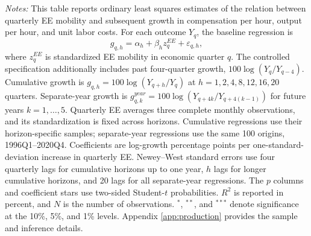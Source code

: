 \begin{table}[H]
\begin{minipage}[t]{\linewidth}
\textit{Notes:} This table reports ordinary least squares estimates of the relation between quarterly EE mobility and subsequent growth in compensation per hour, output per hour, and unit labor costs. For each outcome $Y_q$, the baseline regression is
\[g_{q,h}=\alpha_h+\beta_h z_q^{EE}+\varepsilon_{q,h},\]
where $z_q^{EE}$ is standardized EE mobility in economic quarter $q$. The controlled specification additionally includes past four-quarter growth, $100\log(Y_q/Y_{q-4})$. Cumulative growth is $g_{q,h}=100\log(Y_{q+h}/Y_q)$ at $h=1,2,4,8,12,16,20$ quarters. Separate-year growth is $g^{year}_{q,k}=100\log(Y_{q+4k}/Y_{q+4(k-1)})$ for future years $k=1,\ldots,5$. Quarterly EE averages three complete monthly observations, and its standardization is fixed across horizons. Cumulative regressions use their horizon-specific samples; separate-year regressions use the same 100 origins, 1996Q1--2020Q4. Coefficients are log-growth percentage points per one-standard-deviation increase in quarterly EE. Newey--West standard errors use four quarterly lags for cumulative horizons up to one year, $h$ lags for longer cumulative horizons, and 20 lags for all separate-year regressions. The $p$ columns and coefficient stars use two-sided Student-$t$ probabilities. $R^2$ is reported in percent, and $N$ is the number of observations. $^{*}$, $^{**}$, and $^{***}$ denote significance at the 10\%, 5\%, and 1\% levels. Appendix \ref{app:production} provides the sample and inference details.\par\end{minipage}
\end{table}
